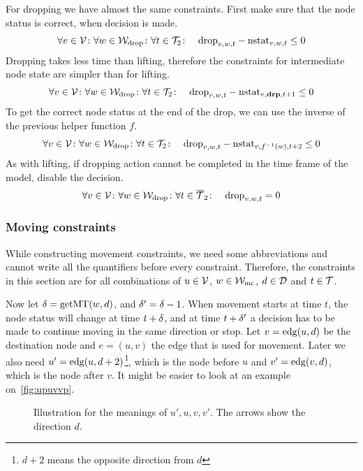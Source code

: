 For dropping we have almost the same constraints. First make sure that the node
status is correct, when decision is made.
\begin{align}
    &\forall v \in \mathcal{V} \colon \forall w \in \mathcal{W}_\mathrm{drop} \colon \forall t \in \mathcal{T}_2 \colon
    &\mathrm{drop}_{v,w,t} - \mathrm{nstat}_{v,w,t} \leq 0
\end{align}
Dropping takes less time than lifting, therefore the constraints for
intermediate node state are simpler than for lifting.
\begin{align}
    &\forall v \in \mathcal{V} \colon \forall w \in \mathcal{W}_\mathrm{drop} \colon \forall t \in \mathcal{T}_2 \colon
    &\mathrm{drop}_{v,w,t} - \mathrm{nstat}_{v,\text{\bf drp},t+1} \leq 0
\end{align}
To get the correct node status at the end of the drop, we can use the inverse
of the previous helper function $f$.
\begin{align}
    &\forall v \in \mathcal{V} \colon \forall w \in \mathcal{W}_\mathrm{drop} \colon \forall t \in \mathcal{T}_2 \colon
    &\mathrm{drop}_{v,w,t} - \mathrm{nstat}_{v,f^{-1}(w),t+2} \leq 0
\end{align}
As with lifting, if dropping action cannot be completed in the time frame of
the model, disable the decision.
\begin{align}
    &\forall v \in \mathcal{V} \colon \forall w \in \mathcal{W}_\mathrm{drop} \colon \forall t \in \overline{\mathcal{T}}_2
    \colon &\mathrm{drop}_{v,w,t} = 0
\end{align}

\subsubsection{Moving constraints}
While constructing movement constraints, we need some abbreviations and cannot
write all the quantifiers before every constraint. Therefore, the constraints
in this section are for all combinations of $u \in \mathcal{V}$, $w \in \mathcal{W}_\mathrm{mc}$, $d \in
\mathcal{D}$ and $t \in \mathcal{T}$. 

Now let $\delta = \mathrm{getMT}(w,d)$, and $\delta' = \delta-1$. When movement starts at time $t$,
the node status will change at time $t+\delta$, and at time $t+\delta'$ a decision
has to be made to continue moving in the same direction or stop. Let $v =
\mathrm{edg}(u,d)$ be the destination node and $e = (u,v)$ the edge that is used for
movement. Later we also need $u' = \mathrm{edg}(u,d+2)$\footnote{$d+2$ means the
opposite direction from $d$}, which is the node before $u$ and $v' =
\mathrm{edg}(v,d)$, which is the node after $v$. It might be easier to look at an
example on~\autoref{fig:upuvvp}.

\begin{figure}[h]
    \begin{center}
        
        \caption{Illustration for the meanings of $u',u,v,v'$. The arrows show
        the direction $d$.}
        \label{fig:upuvvp}
    \end{center}
\end{figure}

